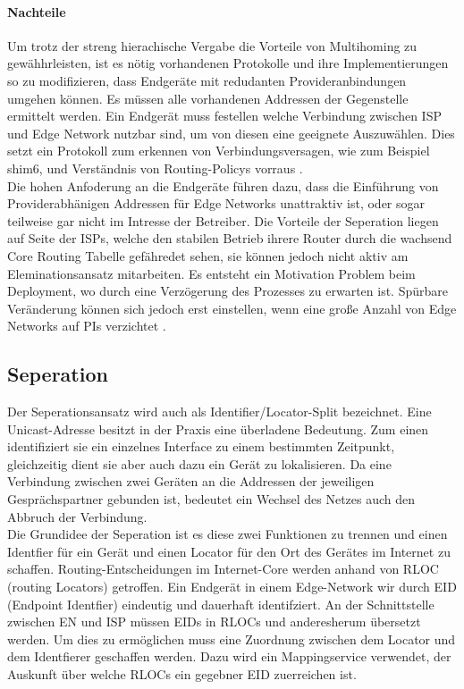 \paragraph{Nachteile} %
Um trotz der streng hierachische Vergabe die Vorteile von Multihoming zu gewähhrleisten, ist es nötig vorhandenen Protokolle und ihre Implementierungen so zu modifizieren, dass Endgeräte mit redudanten Provideranbindungen umgehen können. Es müssen alle vorhandenen Addressen der Gegenstelle ermittelt werden. Ein Endgerät muss festellen welche Verbindung zwischen ISP und Edge Network nutzbar sind, um von diesen eine geeignete Auszuwählen. Dies setzt ein Protokoll zum erkennen von Verbindungsversagen, wie zum Beispiel shim6, und Verständnis von Routing-Policys vorraus \cite{jen:2008:start}. \\
Die hohen Anfoderung an die Endgeräte führen dazu, dass die Einführung von Providerabhänigen Addressen für Edge Networks unattraktiv ist, oder sogar teilweise gar nicht im Intresse der Betreiber. Die Vorteile der Seperation liegen auf Seite der ISPs, welche den stabilen Betrieb ihrere Router durch die wachsend Core Routing Tabelle gefähredet sehen, sie können jedoch nicht aktiv am Eleminationsansatz mitarbeiten. Es entsteht ein Motivation Problem beim Deployment, wo durch eine Verzögerung des Prozesses zu erwarten ist. Spürbare Veränderung können sich jedoch erst einstellen, wenn eine große Anzahl von Edge Networks auf PIs verzichtet \cite{jen:2008:start}. 

\subsection{Seperation} %
Der Seperationsansatz wird auch als Identifier/Locator-Split bezeichnet. Eine Unicast-Adresse besitzt in der Praxis eine überladene Bedeutung. Zum einen identifiziert sie ein einzelnes Interface zu einem bestimmten Zeitpunkt, gleichzeitig dient sie aber auch dazu ein Gerät zu lokalisieren. Da eine Verbindung zwischen zwei Geräten an die Addressen der jeweiligen Gesprächspartner gebunden ist, bedeutet ein Wechsel des Netzes auch den Abbruch der Verbindung.  \\

Die Grundidee der Seperation ist es diese zwei Funktionen zu trennen und einen Identfier für ein Gerät und einen Locator für den Ort des Gerätes im Internet zu schaffen. Routing-Entscheidungen im Internet-Core werden anhand von RLOC (routing Locators) getroffen. Ein Endgerät in einem Edge-Network wir durch EID (Endpoint Identfier) eindeutig und dauerhaft identifziert. An der Schnittstelle zwischen EN und ISP müssen EIDs in RLOCs und anderesherum übersetzt werden. Um dies zu ermöglichen muss eine Zuordnung zwischen dem Locator und dem Identfierer geschaffen werden. Dazu wird ein Mappingservice verwendet, der Auskunft über welche RLOCs ein gegebner EID zuerreichen ist. 

